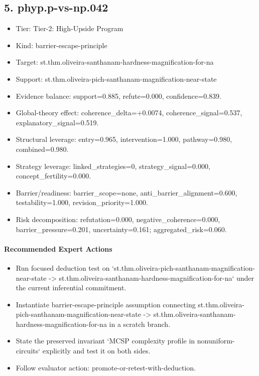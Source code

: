 \documentclass[11pt]{article}
\begin{document}
\subsection*{5. phyp.p-vs-np.042}
\begin{itemize}
\item Tier: Tier-2: High-Upside Program
\item Kind: barrier-escape-principle
\item Target: st.thm.oliveira-santhanam-hardness-magnification-for-na
\item Support: st.thm.oliveira-pich-santhanam-magnification-near-state
\item Evidence balance: support=0.885, refute=0.000, confidence=0.839.
\item Global-theory effect: coherence\_delta=+0.0074, coherence\_signal=0.537, explanatory\_signal=0.519.
\item Structural leverage: entry=0.965, intervention=1.000, pathway=0.980, combined=0.980.
\item Strategy leverage: linked\_strategies=0, strategy\_signal=0.000, concept\_fertility=0.000.
\item Barrier/readiness: barrier\_scope=none, anti\_barrier\_alignment=0.600, testability=1.000, revision\_priority=1.000.
\item Risk decomposition: refutation=0.000, negative\_coherence=0.000, barrier\_pressure=0.201, uncertainty=0.161; aggregated\_risk=0.060.
\end{itemize}
\paragraph{Recommended Expert Actions}
\begin{itemize}
\item Run focused deduction test on `st.thm.oliveira-pich-santhanam-magnification-near-state -> st.thm.oliveira-santhanam-hardness-magnification-for-na` under the current inferential commitment.
\item Instantiate barrier-escape-principle assumption connecting st.thm.oliveira-pich-santhanam-magnification-near-state -> st.thm.oliveira-santhanam-hardness-magnification-for-na in a scratch branch.
\item State the preserved invariant `MCSP complexity profile in nonuniform-circuits` explicitly and test it on both sides.
\item Follow evaluator action: promote-or-retest-with-deduction.
\end{itemize}
\end{document}

